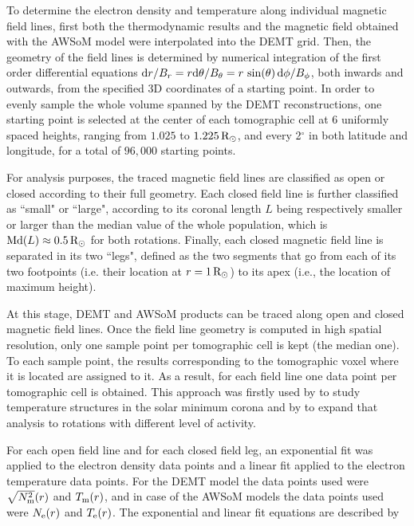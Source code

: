 \documentclass[namedreferences]{solarphysics}
\newcommand{\mrsun}{{\rm R_\odot}}
\newcommand{\Te}{T_{\rm e}}
\newcommand{\Tm}{T_{\rm m}}
\newcommand{\Ne}{N_{\rm e}}
\newcommand{\Nsqm}{N^2_{{\rm m}}}
\newcommand{\sqravgN}{\sqrt{\Nsqm}}
\begin{document}
\begin{article}
{To determine} the electron density and temperature along individual magnetic field lines, first both the thermodynamic results and the magnetic field obtained with the AWSoM model were interpolated into the DEMT grid. Then, the geometry of the field lines is determined by numerical integration of the first order differential equations  ${\rm d}r/B_r = r{\rm d}\theta/B_\theta = r\,\sin(\theta)\,{\rm d}\phi/B_\phi$, both inwards and outwards, from the specified 3D coordinates of a starting point. In order to evenly sample the whole volume spanned by the DEMT reconstructions, one starting point is selected at the center of each tomographic cell at 6 uniformly spaced heights, ranging from $1.025$ to $1.225\,\mrsun$, and every 2$^\circ$ in both latitude and longitude, for a total of $96,000$ starting points. 

{For analysis purposes, {the traced magnetic field lines are classified as open or closed according to their full geometry. Each closed field} line is further classified as ``small" or ``large", according to its coronal length $L$ being {respectively smaller or larger than the median value of the whole population, which is ${\rm Md}(L)\approx 0.5\,\mrsun$ for both rotations.} Finally, each closed magnetic field line is separated in its two ``legs", defined as the two segments that go from each of its two footpoints (i.e. their location at $r=1\,\mrsun$) to its apex (i.e., the location of maximum height).}

At this {stage, DEMT and AWSoM products} can be traced along open and closed magnetic field lines. Once the field line geometry is computed in high spatial resolution, only one sample point per tomographic cell is kept (the median one). To each sample point, the results corresponding to the tomographic voxel where it is located are assigned to it. As a result, for each field line one data point per tomographic cell {is obtained. This approach} was firstly used by \citet{huang_2012} to {study temperature} structures in the solar minimum {corona and by} \citet{nuevo_2013} to expand that analysis to rotations with different level of activity.

For each open field line and {for each closed field leg}, an exponential fit {was applied} to the electron density {data points} and a linear fit applied to the electron temperature {data points}. For {the DEMT model} the data points used were $\sqravgN(r)$ and $\Tm(r)$, and in case of {the AWSoM models} the data points used were $\Ne(r)$ and $\Te(r)$. The exponential and linear fit equations are described by


\end{article}
\end{document}
